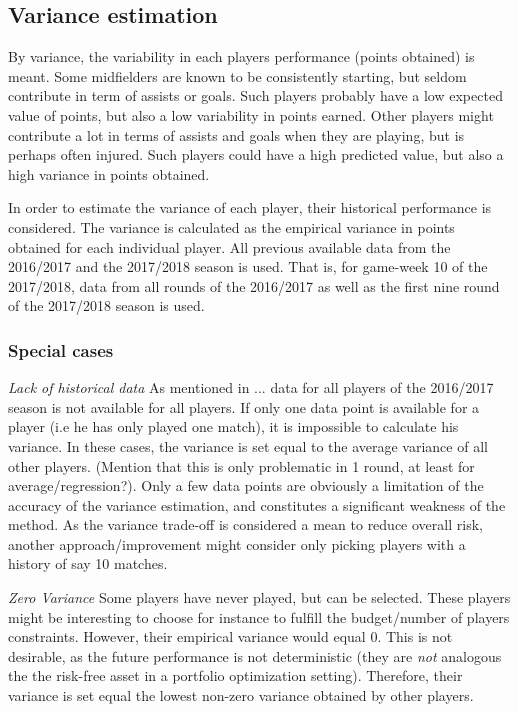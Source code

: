 \subsection{Variance estimation}
By variance, the variability in each players performance (points obtained) is meant. Some midfielders are known to be consistently starting, but seldom contribute in term of assists or goals. Such players probably have a low expected value of points, but also a low variability in points earned. Other players might contribute a lot in terms of assists and goals when they are playing, but is perhaps often injured. Such players could have a high predicted value, but also a high variance in points obtained.\newpar

In order to estimate the variance of each player, their historical performance is considered. The variance is calculated as the empirical variance in points obtained for each individual player. All previous available data from the 2016/2017 and the 2017/2018 season is used. That is, for game-week 10 of the 2017/2018, data from all rounds of the 2016/2017 as well as the first nine round of the 2017/2018 season is used.\newpar

\subsubsection{Special cases}
\textit{Lack of historical data}\newline
As mentioned in ... data for all players of the 2016/2017 season is not available for all players. If only one data point is available for a player (i.e he has only played one match), it is impossible to calculate his variance. In these cases, the variance is set equal to the average variance of all other players. (Mention that this is only problematic in 1 round, at least for average/regression?). Only a few data points are obviously a limitation of the accuracy of the variance estimation, and constitutes a significant weakness of the method. As the variance trade-off is considered a mean to reduce overall risk, another approach/improvement might consider only picking players with a history of say 10 matches. \newpar

\textit{Zero Variance}\newline
Some players have never played, but can be selected. These players might be interesting to choose for instance to fulfill the budget/number of players constraints. However, their empirical variance would equal 0. This is not desirable, as the future performance is not deterministic (they are \textit{not} analogous the the risk-free asset in a portfolio optimization setting). Therefore, their variance is set equal the lowest non-zero variance obtained by other players.

